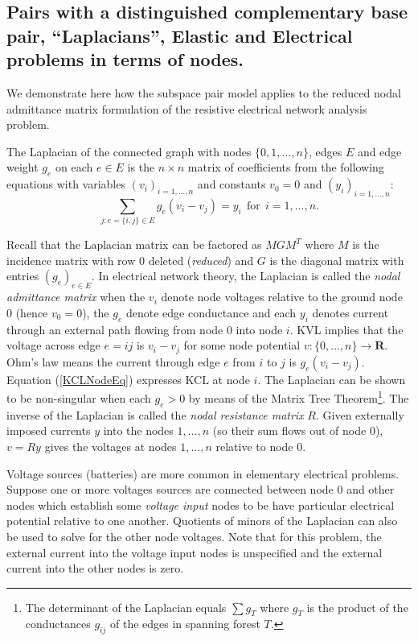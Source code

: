\documentclass{amsproc-sunycstr}
\def\Reals{\ensuremath{\mathbf R}}
\theoremstyle{plain}
\theoremstyle{definition}
\theoremstyle{remark}
\newcommand{\extra}[1]{{{#1}}}
\begin{document}
\extra{
\subsection{Pairs with a distinguished complementary base pair,
``Laplacians'', Elastic and Electrical problems in terms
of nodes.}



We demonstrate here how the subspace pair model applies to 
the reduced nodal admittance matrix formulation of the resistive
electrical network analysis problem.  

The Laplacian of the connected graph with nodes $\{0,1,\ldots,n\}$, edges
$E$ and edge weight $g_e$ on each $e\in E$ is the 
$n \times n$ matrix of coefficients from
the following equations with variables $(v_i)_{i=1,\ldots,n}$ and constants
$v_0=0$ and $(y_i)_{i=1,\ldots,n}$:
\begin{equation}
\label{KCLNodeEq}
\sum_{j:e=\{i,j\}\in E} g_e(v_i-v_j)=y_i\mathrm{\ \ for\ \ }i=1,\ldots,n.
\end{equation}

Recall that 
the Laplacian matrix can be factored as $MGM^T$ where $M$ is the 
incidence matrix with row $0$ deleted (\textit{reduced})
and $G$ is the diagonal
matrix with entries $(g_e)_{e\in E}$.  
In electrical network theory, the Laplacian is called the 
\textit{nodal admittance matrix} when the $v_i$ denote node voltages
relative to the ground node $0$ (hence $v_0=0$), 
the $g_e$ denote edge conductance and each
$y_i$ denotes current through an external path flowing from node
$0$ into node $i$.  
KVL implies that the voltage across edge $e=ij$ is $v_i-v_j$ for some
node potential $v:\{0,\ldots,n\}\rightarrow\Reals$.  Ohm's law means the
current through edge $e$ from $i$ to $j$ is $g_e(v_i-v_j)$.  Equation
(\ref{KCLNodeEq}) expresses KCL at node $i$.
The Laplacian can be shown
to be non-singular when each $g_e>0$ by means of the 
Matrix Tree Theorem\footnote{The determinant of the Laplacian equals
$\sum g_T$ where $g_T$ is the product of the conductances $g_{ij}$ of
the edges in spanning forest $T$.}.
The inverse of the Laplacian is called the 
\textit{nodal resistance matrix} $R$. 
Given externally imposed currents $y$ into the nodes $1,\ldots,n$
(so their sum flows out of node $0$),  $v=Ry$ 
gives the voltages at nodes $1,\ldots,n$ relative to node $0$.

Voltage sources (batteries) are more common in elementary electrical
problems.  
Suppose one or more voltages sources are connected between node $0$ and other
nodes which establish some \textit{voltage input} nodes to be have particular
electrical potential relative to one another.
Quotients of minors of the Laplacian can also be used
to solve for the other node voltages.
Note that for this problem, the external 
current into the voltage input nodes is
unspecified and the external current into the other nodes is zero.


}
\end{document}
